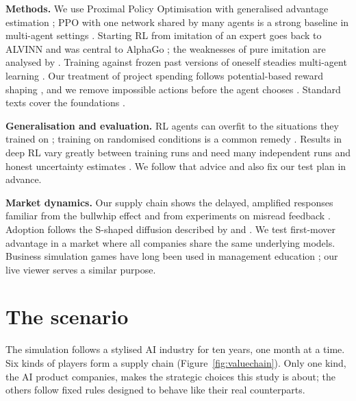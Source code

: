 \documentclass[11pt]{article}
\begin{document}
\textbf{Methods.} We use Proximal Policy Optimisation \citep{schulman2017ppo} with generalised advantage estimation \citep{schulman2016gae}; PPO with one network shared by many agents is a strong baseline in multi-agent settings \citep{yu2022mappo}. Starting RL from imitation of an expert goes back to ALVINN \citep{pomerleau1991alvinn} and was central to AlphaGo \citep{silver2016alphago}; the weaknesses of pure imitation are analysed by \citet{ross2011dagger}. Training against frozen past versions of oneself steadies multi-agent learning \citep{vinyals2019alphastar}. Our treatment of project spending follows potential-based reward shaping \citep{ng1999shaping}, and we remove impossible actions before the agent chooses \citep{huang2022masking}. Standard texts cover the foundations \citep{sutton2018rl}.

\textbf{Generalisation and evaluation.} RL agents can overfit to the situations they trained on \citep{cobbe2019generalization}; training on randomised conditions is a common remedy \citep{tobin2017domain}. Results in deep RL vary greatly between training runs and need many independent runs and honest uncertainty estimates \citep{henderson2018matters,agarwal2021precipice}. We follow that advice and also fix our test plan in advance.

\textbf{Market dynamics.} Our supply chain shows the delayed, amplified responses familiar from the bullwhip effect \citep{lee1997bullwhip} and from experiments on misread feedback \citep{sterman1989misperceptions}. Adoption follows the S-shaped diffusion described by \citet{bass1969diffusion} and \citet{rogers2003diffusion}. We test first-mover advantage \citep{lieberman1988firstmover} in a market where all companies share the same underlying models. Business simulation games have long been used in management education \citep{faria2009gaming}; our live viewer serves a similar purpose.

\section{The scenario}
\label{sec:scenario}

The simulation follows a stylised AI industry for ten years, one month at a time. Six kinds of players form a supply chain (Figure~\ref{fig:valuechain}). Only one kind, the AI product companies, makes the strategic choices this study is about; the others follow fixed rules designed to behave like their real counterparts.
\end{document}
